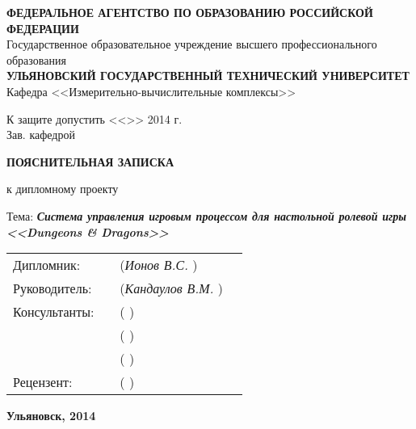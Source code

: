 \begin{titlepage}

\sffamily


\small
\begin{center}

\textbf{ФЕДЕРАЛЬНОЕ АГЕНТСТВО ПО ОБРАЗОВАНИЮ РОССИЙСКОЙ ФЕДЕРАЦИИ}\\
Государственное образовательное учреждение высшего профессионального образования\\
\textbf{УЛЬЯНОВСКИЙ ГОСУДАРСТВЕННЫЙ ТЕХНИЧЕСКИЙ УНИВЕРСИТЕТ}\\[0.7cm]

Кафедра <<Измерительно-вычислительные комплексы>>\\[0.7cm]

\begin{flushright}

К защите допустить <<\underline{\hspace{1cm}}>>\underline{\hspace{2.5cm}} 2014 г.\\
Зав. кафедрой \underline{\hspace{3.5cm}}

\end{flushright}

\vspace{1.5cm}

\LARGE

\textbf{ПОЯСНИТЕЛЬНАЯ ЗАПИСКА}

\Large

к дипломному проекту\\[0.7cm]

\normalsize

Тема: \textbf{\textit{\emph{Система управления игровым процессом для настольной ролевой игры <<Dungeons \& Dragons>>}}}

\vspace{2cm}

\begin{tabular}{l m{6cm} m{5cm} l}
    Дипломник:    & \emph{\hfill} & (\emph{Ионов В.С.\hfill}     )  & \\[0.5cm]
    Руководитель: & \emph{\hfill} & (\emph{Кандаулов В.М.\hfill} )  & \\[0.5cm]
    Консультанты: & \emph{\hfill} & (\emph{\hfill}               )  & \\[0.5cm]
                  & \emph{\hfill} & (\emph{\hfill}               )  & \\[0.5cm]
                  & \emph{\hfill} & (\emph{\hfill}               )  & \\[0.5cm]
    Рецензент:    & \emph{\hfill} & (\emph{\hfill}               )  & \\
\end{tabular}

\vfill

\textbf{Ульяновск, 2014}

\end{center}

\end{titlepage}

\restoregeometry
